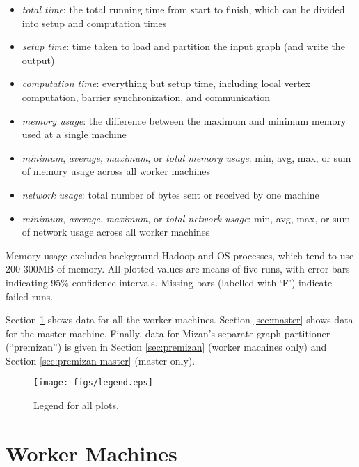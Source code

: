 \documentclass{article}
\newcommand{\bline}[1][1]{\vspace{#1\baselineskip}}
\begin{document}
\begin{itemize}
  \setlength{\itemsep}{0pt}
\item \textit{total time}: the total running time from start to finish, which can be divided into setup and computation times
\item \textit{setup time}: time taken to load and partition the input graph (and write the output)
\item \textit{computation time}: everything but setup time, including local vertex computation, barrier synchronization, and communication
\bline[0.5]
\item \textit{memory usage}: the difference between the maximum and minimum memory used at a single machine
\item \textit{minimum}, \textit{average}, \textit{maximum}, or \textit{total memory usage}: min, avg, max, or sum of memory usage across all worker machines
\bline[0.5]
\item \textit{network usage}: total number of bytes sent or received by one machine
\item \textit{minimum}, \textit{average}, \textit{maximum}, or \textit{total network usage}: min, avg, max, or sum of network usage across all worker machines
\end{itemize}

\noindent Memory usage excludes background Hadoop and OS processes, which tend to use 200-300MB of memory. All plotted values are means of five runs, with error bars indicating 95\% confidence intervals. Missing bars (labelled with `F') indicate failed runs.

\bline
Section \ref{sec:workers} shows data for all the worker machines. Section \ref{sec:master} shows data for the master machine. Finally, data for Mizan's separate graph partitioner (``premizan'') is given in Section \ref{sec:premizan} (worker machines only) and Section \ref{sec:premizan-master} (master only).

\bline[0.5]
\begin{figure}[ht]
  \centering
  \texttt{[image: figs/legend.eps]}
  \caption{Legend for all plots.}
  \label{fig:legend}
\end{figure}


\pagebreak
\section{Worker Machines}
\label{sec:workers}
\end{document}
